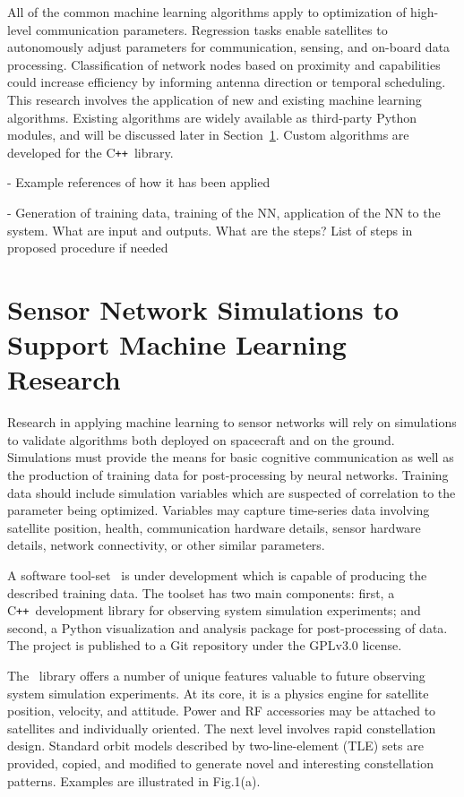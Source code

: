 \documentclass[conference]{IEEEtran}
\newcommand{\project}{{\sc{Collaborate}}~}
\newcommand{\cpp}{C\texttt{++}~}
\begin{document}
All of the common machine learning algorithms apply to optimization of high-level communication parameters.  Regression tasks enable satellites to autonomously adjust parameters for communication, sensing, and on-board data processing.  Classification of network nodes based on proximity and capabilities could increase efficiency by informing antenna direction or temporal scheduling.  This research involves the application of new and existing machine learning algorithms.  Existing algorithms are widely available as third-party Python modules, and will be discussed later in Section~\ref{sec:software}.  Custom algorithms are developed for the \cpp library.

{
  \color{red}
  - Example references of how it has been applied

  - Generation of training data, training of the NN, application of the NN to the system. What are input and outputs. What are the steps? List of steps in proposed procedure if needed
}


\section{Sensor Network Simulations to Support Machine Learning Research}
\label{sec:software}

Research in applying machine learning to sensor networks will rely on simulations to validate algorithms both deployed on spacecraft and on the ground.  Simulations must provide the means for basic cognitive communication as well as the production of training data for post-processing by neural networks.  Training data should include simulation variables which are suspected of correlation to the parameter being optimized.  Variables may capture time-series data involving satellite position, health, communication hardware details, sensor hardware details, network connectivity, or other similar parameters.

A software tool-set \project is under development which is capable of producing the described training data.  The toolset has two main components: first, a \cpp development library for observing system simulation experiments; and second, a Python visualization and analysis package for post-processing of data.  The project is published to a Git repository under the GPLv3.0 license.

The \project library offers a number of unique features valuable to future observing system simulation experiments.  At its core, it is a physics engine for satellite position, velocity, and attitude.  Power and RF accessories may be attached to satellites and individually oriented.  The next level involves rapid constellation design.  Standard orbit models described by two-line-element (TLE) sets are provided, copied, and modified to generate novel and interesting constellation patterns.  Examples are illustrated in Fig.1(a).
\end{document}
